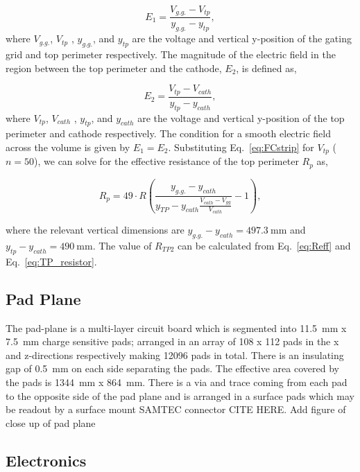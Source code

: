 \begin{equation}
E_1 = \frac{V_{g.g.} - V_{tp}}{ y_{g.g.} - y_{tp} },
\end{equation}
where  $V_{g.g.}$, $V_{tp}$ , $y_{g.g.}$, and $y_{tp}$ are the voltage and vertical y-position of the gating grid and top perimeter respectively. The magnitude of the electric field in the region between the top perimeter and the cathode, $E_2$, is defined as,

\begin{equation}
E_2 = \frac{V_{tp} - V_{cath}}{ y_{tp} - y_{cath} },
\end{equation}
where  $V_{tp}$, $V_{cath}$ , $y_{tp}$, and $y_{cath}$ are the voltage and vertical y-position of the top perimeter and cathode respectively. The condition for a smooth electric field across the volume is given by $E_1 = E_2$. Substituting Eq.~\ref{eq:FCstrip} for $V_{tp}$ ($n=50$), we can solve for the effective resistance of the top perimeter $R_p$ as, 

\begin{equation}
R_p = 49 \cdot R  \left(\frac{ y_{g.g.} - y_{cath} }{ y_{TP} - y_{cath} \frac{V_{cath} - V_{gg}}{V_{cath}} }- 1 \right),
\label{eq:TP_resistor}
\end{equation}

where the relevant vertical dimensions are $y_{g.g.} - y_{cath} = \SI{497.3}{\milli\metre}$ and $y_{tp} - y_{cath} = \SI{490}{\milli\metre}$. The value of $R_{TP2}$ can be calculated from Eq.~\ref{eq:Reff} and Eq.~\ref{eq:TP_resistor}.


\subsection{Pad Plane}
The pad-plane is a multi-layer circuit board which is segmented into \SI{11.5}{\milli\metre} x \SI{7.5}{\milli\metre} charge sensitive pads; arranged in an array of 108 x 112 pads in the x and z-directions respectively making 12096 pads in total. There is an insulating gap of \SI{0.5}{\milli\metre} on each side separating the pads. The effective area covered by the pads is \SI{1344}{\milli\metre} x \SI{864}{\milli\metre}. There is a via and trace coming from each pad to the opposite side of the pad plane and is arranged in a surface pads which may be readout by a surface mount SAMTEC connector CITE HERE. 
Add figure of close up of pad plane 



\subsection{Electronics}

